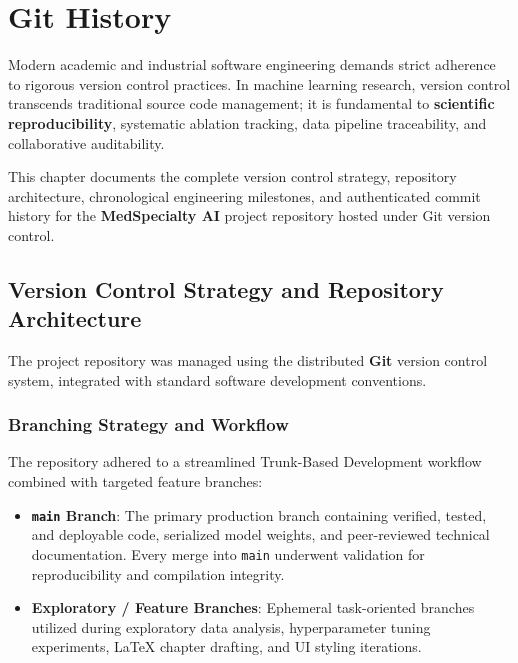 \clearpage

\section{Git History}

Modern academic and industrial software engineering demands strict adherence to rigorous version control practices. In machine learning research, version control transcends traditional source code management; it is fundamental to \textbf{scientific reproducibility}, systematic ablation tracking, data pipeline traceability, and collaborative auditability. 

This chapter documents the complete version control strategy, repository architecture, chronological engineering milestones, and authenticated commit history for the \textbf{MedSpecialty AI} project repository hosted under Git version control.

\subsection{Version Control Strategy and Repository Architecture}

The project repository was managed using the distributed \textbf{Git} version control system, integrated with standard software development conventions.

\subsubsection{Branching Strategy and Workflow}
The repository adhered to a streamlined Trunk-Based Development workflow combined with targeted feature branches:
\begin{itemize}
    \item \textbf{\texttt{main} Branch}: The primary production branch containing verified, tested, and deployable code, serialized model weights, and peer-reviewed technical documentation. Every merge into \texttt{main} underwent validation for reproducibility and compilation integrity.
    \item \textbf{Exploratory / Feature Branches}: Ephemeral task-oriented branches utilized during exploratory data analysis, hyperparameter tuning experiments, LaTeX chapter drafting, and UI styling iterations.
\end{itemize}

